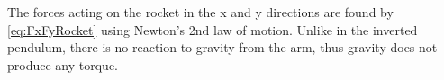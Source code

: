 		
		The forces acting on the rocket in the x and y directions are found by \vref{eq:FxFyRocket} using Newton's 2nd law of motion. Unlike in the inverted pendulum, there is no reaction to gravity from the arm, thus gravity does not produce any torque.
		
